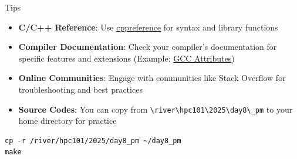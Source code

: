 \begin{frame}[fragile]{ Tips}
	\begin{itemize}
		\item \textbf{C/C++ Reference}: Use \textcolor{blue}{\href{https://en.cppreference.com/}{cppreference}} for syntax and library functions
		\item \textbf{Compiler Documentation}: Check your compiler's documentation for specific features and extensions (Example: \textcolor{blue}{\href{https://gcc.gnu.org/onlinedocs/gcc/Attributes.html}{GCC Attributes}})
		\item \textbf{Online Communities}: Engage with communities like Stack Overflow for troubleshooting and best practices
		\item \textbf{Source Codes}: You can copy from \verb|\river\hpc101\2025\day8\_pm| to your home directory for practice
	\end{itemize}
	\begin{verbatim}
cp -r /river/hpc101/2025/day8_pm ~/day8_pm
make
    \end{verbatim}
\end{frame}


